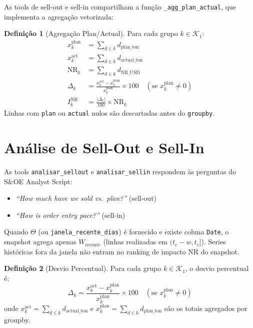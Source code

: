 \documentclass[a4paper, 12pt]{report}
\theoremstyle{definition}
\newtheorem{definicao}{Defini\c{c}\~ao}[chapter]
\theoremstyle{remark}
\begin{document}
As tools de sell-out e sell-in compartilham a fun\c{c}\~ao
\texttt{\_agg\_plan\_actual}, que implementa a agrega\c{c}\~ao vetorizada:

\begin{definicao}[Agrega\c{c}\~ao Plan/Actual]
  Para cada grupo $k \in \mathcal{K}_1$:
  \begin{align*}
    x^{\text{plan}}_k &= \sum_{d \in k} d_{\text{plan\_ton}} \\
    x^{\text{act}}_k  &= \sum_{d \in k} d_{\text{actual\_ton}} \\
    \text{NR}_k         &= \sum_{d \in k} d_{\text{NR\_USD}} \\
    \Delta_k            &= \frac{x^{\text{act}}_k - x^{\text{plan}}_k}{x^{\text{plan}}_k} \times 100
      \quad (\text{se } x^{\text{plan}}_k \neq 0) \\
    I^{\text{NR}}_k     &= \frac{|\Delta_k|}{100} \times \text{NR}_k
  \end{align*}
  Linhas com \texttt{plan} ou \texttt{actual} nulos s\~ao descartadas
  antes do \texttt{groupby}.
\end{definicao}


\section{An\'alise de Sell-Out e Sell-In}

As tools \texttt{analisar\_sellout} e \texttt{analisar\_sellin} respondem
\`as perguntas do S\&OE Analyst Script:
\begin{itemize}
  \item \textit{``How much have we sold vs.\ plan?''} (sell-out)
  \item \textit{``How is order entry pace?''} (sell-in)
\end{itemize}

Quando $\Theta$ (ou \texttt{janela\_recente\_dias}) \'e fornecido e existe
coluna \texttt{Date}, o snapshot agrega apenas $W_{\text{recente}}$
(linhas realizadas em $(t_c-w, t_c]$). Series hist\'oricas fora da
janela n\~ao entram no ranking de impacto NR do snapshot.

\begin{definicao}[Desvio Percentual]
  Para cada grupo $k \in \mathcal{K}_1$, o desvio percentual \'e:
  \[
    \Delta_k = \frac{x^{\text{act}}_k - x^{\text{plan}}_k}{x^{\text{plan}}_k} \times 100
    \quad (\text{se } x^{\text{plan}}_k \neq 0)
  \]
  onde $x^{\text{act}}_k = \sum_{d \in k} d_{\text{actual\_ton}}$ e
  $x^{\text{plan}}_k = \sum_{d \in k} d_{\text{plan\_ton}}$ s\~ao os
  totais agregados por groupby.
\end{definicao}
\end{document}
